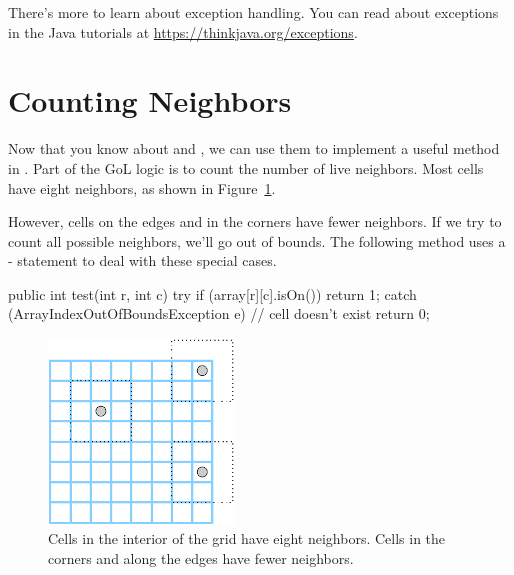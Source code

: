 There's more to learn about exception handling.
You can read about exceptions in the Java tutorials at \url{https://thinkjava.org/exceptions}.


\section{Counting Neighbors}


Now that you know about  and , we can use them to implement a useful method in .
Part of the GoL logic is to count the number of live neighbors.
Most cells have eight neighbors, as shown in Figure~\ref{fig:neighbors}.

However, cells on the edges and in the corners have fewer neighbors.
If we try to count all possible neighbors, we'll go out of bounds.
The following method uses a - statement to deal with these special cases.

\begin{code}
public int test(int r, int c) {
    try {
        if (array[r][c].isOn()) {
            return 1;
        }
    } catch (ArrayIndexOutOfBoundsException e) {
        // cell doesn't exist
    }
    return 0;
}
\end{code}

\begin{figure}[!ht]
\begin{center}
\includegraphics[height=140pt]{figs/grid.pdf}
\caption{Cells in the interior of the grid have eight neighbors.
Cells in the corners and along the edges have fewer neighbors.}
\label{fig:neighbors}
\end{center}
\end{figure}

